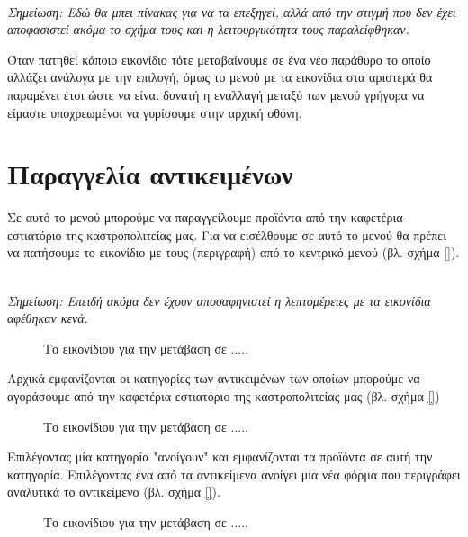\documentclass[a4paper,titlepage,twoside,12pt,leqno]{article}
\begin{document}
\emph{\\Σημείωση: Εδώ θα μπει πίνακας για να τα επεξηγεί, αλλά από την στιγμή που δεν έχει αποφασιστεί ακόμα το σχήμα τους και η λειτουργικότητα τους παραλείφθηκαν.\\}

Όταν πατηθεί κάποιο εικονίδιο τότε μεταβαίνουμε σε ένα νέο παράθυρο το οποίο αλλάζει ανάλογα με την επιλογή, όμως το μενού με τα εικονίδια στα αριστερά θα παραμένει έτσι ώστε να είναι δυνατή η εναλλαγή μεταξύ των μενού γρήγορα να είμαστε υποχρεωμένοι να γυρίσουμε στην αρχική οθόνη.

\section{Παραγγελία αντικειμένων}
\label{paraggelia}

Σε αυτό το μενού μπορούμε να παραγγείλουμε προϊόντα από την καφετέρια-εστιατόριο της καστροπολιτείας μας. Για να εισέλθουμε σε αυτό το μενού θα πρέπει να πατήσουμε το εικονίδιο με τους (περιγραφή) από το κεντρικό μενού (βλ. σχήμα \ref{}).

\emph{\\Σημείωση: Επειδή ακόμα δεν έχουν αποσαφηνιστεί η λεπτομέρειες με τα εικονίδια αφέθηκαν κενά.\\}

\begin{figure}
\begin{center}
\resizebox*{10.5cm}{!}{
\rule{0.4\textwidth}{0.3\textwidth}}
\caption{Το εικονίδιου για την μετάβαση σε .....}
\label{fig:icon:}
\end{center}
\end{figure}

Αρχικά εμφανίζονται οι κατηγορίες των αντικειμένων των οποίων μπορούμε να αγοράσουμε από την καφετέρια-εστιατόριο της καστροπολιτείας μας (βλ. σχήμα \ref{})

\begin{figure}
\begin{center}
\resizebox*{10.5cm}{!}{
\rule{0.4\textwidth}{0.3\textwidth}}
\caption{Το εικονίδιου για την μετάβαση σε .....}
\label{fig:icon:}
\end{center}
\end{figure}

Επιλέγοντας μία κατηγορία "ανοίγουν" και εμφανίζονται τα προϊόντα σε αυτή την κατηγορία. Επιλέγοντας ένα από τα αντικείμενα ανοίγει μία νέα φόρμα που περιγράφει αναλυτικά το αντικείμενο (βλ. σχήμα \ref{}).

\begin{figure}
\begin{center}
\resizebox*{10.5cm}{!}{
\rule{0.4\textwidth}{0.3\textwidth}}
\caption{Το εικονίδιου για την μετάβαση σε .....}
\label{fig:icon:}
\end{center}
\end{figure}
\end{document}

